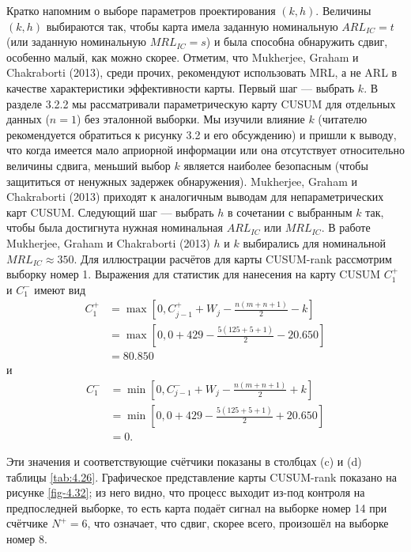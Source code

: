 Кратко напомним о выборе параметров проектирования \((k, h)\). Величины \((k, h)\) выбираются так, чтобы карта имела заданную номинальную \(ARL_{IC} = t\) (или заданную номинальную \(MRL_{IC} = s\)) и была способна обнаружить сдвиг, особенно малый, как можно скорее. Отметим, что Mukherjee, Graham и Chakraborti (2013), среди прочих, рекомендуют использовать MRL, а не ARL в качестве характеристики эффективности карты. Первый шаг --- выбрать \(k\). В разделе 3.2.2 мы рассматривали параметрическую карту CUSUM для отдельных данных (\(n = 1\)) без эталонной выборки. Мы изучили влияние \(k\) (читателю рекомендуется обратиться к рисунку 3.2 и его обсуждению) и пришли к выводу, что когда имеется мало априорной информации или она отсутствует относительно величины сдвига, меньший выбор \(k\) является наиболее безопасным (чтобы защититься от ненужных задержек обнаружения). Mukherjee, Graham и Chakraborti (2013) приходят к аналогичным выводам для непараметрических карт CUSUM. Следующий шаг --- выбрать \(h\) в сочетании с выбранным \(k\) так, чтобы была достигнута нужная номинальная \(ARL_{IC}\) или \(MRL_{IC}\). В работе Mukherjee, Graham и Chakraborti (2013) \(h\) и \(k\) выбирались для номинальной \(MRL_{IC} \approx 350\). Для иллюстрации расчётов для карты CUSUM-rank рассмотрим выборку номер 1. Выражения для статистик для нанесения на карту CUSUM \(C_1^+\) и \(C_1^-\) имеют вид
\begin{align*}
	C_1^+ &= \max\left[ 0, C_{j-1}^+ + W_j - \frac{n(m + n + 1)}{2} - k \right] \\
	      &= \max\left[ 0, 0 + 429 - \frac{5(125 + 5 + 1)}{2} - 20.650 \right] \\
	      &= 80.850
\end{align*}
и
\begin{align*}
	C_1^- &= \min\left[ 0, C_{j-1}^- + W_j - \frac{n(m + n + 1)}{2} + k \right] \\
	      &= \min\left[ 0, 0 + 429 - \frac{5(125 + 5 + 1)}{2} + 20.650 \right] \\
	      &= 0.
\end{align*}

Эти значения и соответствующие счётчики показаны в столбцах (c) и (d) таблицы \ref{tab:4.26}. Графическое представление карты CUSUM-rank показано на рисунке \ref{fig-4.32}; из него видно, что процесс выходит из-под контроля на предпоследней выборке, то есть карта подаёт сигнал на выборке номер 14 при счётчике \(N^+ = 6\), что означает, что сдвиг, скорее всего, произошёл на выборке номер 8.

